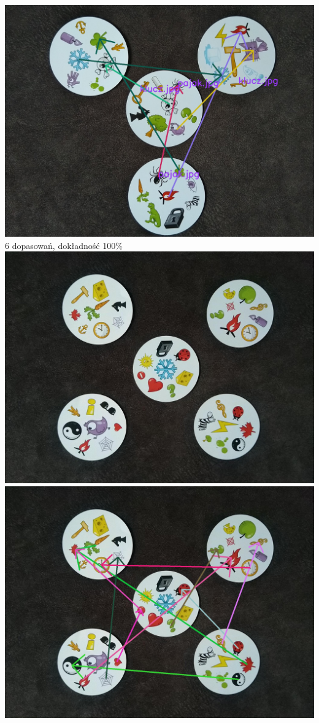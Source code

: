 \documentclass[10pt,a4paper]{article}
\begin{document}
\begin{center}
\includegraphics[scale=0.28]{easy/img_arrows1.jpg}\\
6 dopasowań, dokładność 100\%
\includegraphics[scale=0.28]{easy/dobble03.jpg}
\includegraphics[scale=0.28]{easy/img_arrows2.jpg}\\

\end{center}
\end{document}
